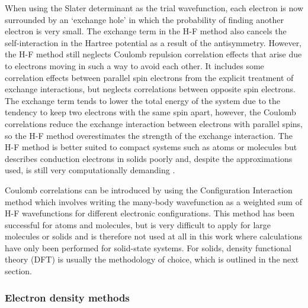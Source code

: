 \documentclass[11pt, twoside]{report}
\begin{document}
When using the Slater determinant as the trial wavefunction, each electron is now surrounded by an `exchange hole' in which the probability of finding another electron is very small. The exchange term in the H-F method also cancels the self-interaction in the Hartree potential as a result of the antisymmetry.
However, the H-F method still neglects Coulomb repulsion correlation effects that arise due to electrons moving in such a way to avoid each other. It includes some correlation effects between parallel spin electrons from the explicit treatment of exchange interactions, but neglects correlations between opposite spin electrons. 
The exchange term tends to lower the total energy of the system due to the tendency to keep two electrons with the same spin apart, however, the Coulomb correlations reduce the exchange interaction between electrons with parallel spins, so the H-F method overestimates the strength of the exchange interaction. The H-F method is better suited to compact systems such as atoms or molecules but describes conduction electrons in solids poorly \cite{Prasad_ch2} and, despite the approximations used, is still very computationally demanding \cite{Prasad_ch1}.

Coulomb correlations can be introduced by using the Configuration Interaction method which involves writing the many-body wavefunction as a weighted sum of H-F wavefunctions for different electronic configurations. This method has been successful for atoms and molecules, but is very difficult to apply for large molecules or solids \cite{Prasad_ch2} and is therefore not used at all in this work where calculations have only been performed for solid-state systems. For solids, density functional theory (DFT) is usually the methodology of choice, which is outlined in the next section.


\subsubsection{Electron density methods}
\end{document}
